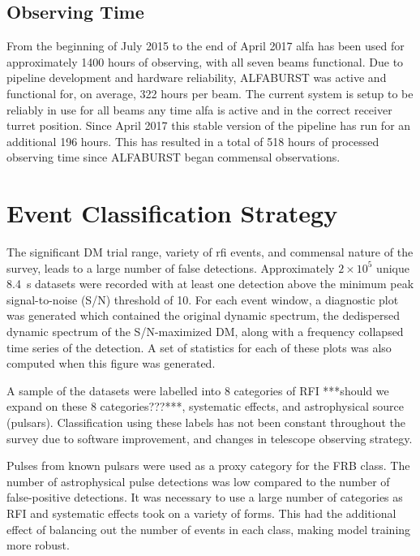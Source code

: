 \documentclass[a4paper,fleqn,usenatbib]{mnras}
\begin{document}


\subsection{Observing Time}
\label{sec:obs_time}

From the beginning of July 2015 to the end of April 2017 \gls{alfa} has been
used for approximately 1400 hours of observing, with all seven beams functional.
Due to pipeline development and hardware reliability, ALFABURST was active and
functional for, on average, 322 hours per beam.  The current system is setup to
be reliably in use for all beams any time \gls{alfa} is active and in the
correct receiver turret position. Since April 2017 this stable version of the
pipeline has run for an additional 196 hours. This has resulted in a total of
518 hours of processed observing time since ALFABURST began commensal
observations.



\section{Event Classification Strategy}
\label{sec:event_classify}


The significant DM trial range, variety of \gls{rfi} events, and commensal
nature of the survey, leads to a large number of false detections. Approximately
$2 \times 10^5$ unique 8.4~s datasets were recorded with at least one detection
above the minimum peak signal-to-noise (S/N) threshold of 10. For each event
window, a diagnostic plot was generated which contained the original dynamic
spectrum, the dedispersed dynamic spectrum of the S/N-maximized DM, along with a
frequency collapsed time series of the detection. A set of statistics for each
of these plots was also computed when this figure was generated.

A sample of the datasets were labelled into 8 categories of RFI ***should we
expand on these 8 categories???***, systematic effects, and astrophysical source
(pulsars). Classification using these labels has not been constant throughout
the survey due to software improvement, and changes in telescope observing
strategy.

Pulses from known pulsars were used as a proxy category for the FRB class. The
number of astrophysical pulse detections was low compared to the number of
false-positive detections. It was necessary to use a large number of categories
as RFI and systematic effects took on a variety of forms.  This had the
additional effect of balancing out the number of events in each class, making
model training more robust.
\end{document}
